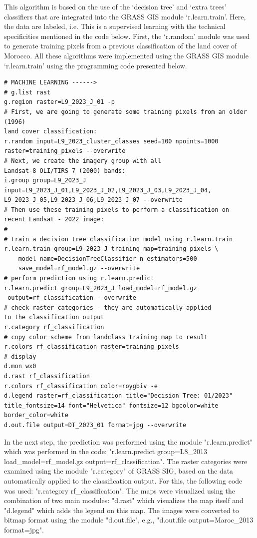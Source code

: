 \documentclass[geomatics,article,submit,pdftex,moreauthors]{Definitions/mdpi}
\begin{document}
This algorithm is based on the use of the ‘decision tree’ and ‘extra trees’ classifiers that are integrated into the GRASS GIS module ‘r.learn.train’. Here, the data are labeled, i.e. This is a supervised learning with the technical specificities mentioned in the code below. First, the ‘r.random’ module was used to generate training pixels from a previous classification of the land cover of Morocco. All these algorithms were implemented using the GRASS GIS module ‘r.learn.train’ using the programming code presented below.

\begin{footnotesize}
\begin{verbatim}
# MACHINE LEARNING ------>
# g.list rast
g.region raster=L9_2023_J_01 -p
# First, we are going to generate some training pixels from an older (1996) 
land cover classification:
r.random input=L9_2023_cluster_classes seed=100 npoints=1000 
raster=training_pixels --overwrite
# Next, we create the imagery group with all 
Landsat-8 OLI/TIRS 7 (2000) bands:
i.group group=L9_2023_J 
input=L9_2023_J_01,L9_2023_J_02,L9_2023_J_03,L9_2023_J_04,
L9_2023_J_05,L9_2023_J_06,L9_2023_J_07 --overwrite
# Then use these training pixels to perform a classification on 
recent Landsat - 2022 image:
#
# train a decision tree classification model using r.learn.train
r.learn.train group=L9_2023_J training_map=training_pixels \
    model_name=DecisionTreeClassifier n_estimators=500 
    save_model=rf_model.gz --overwrite
# perform prediction using r.learn.predict
r.learn.predict group=L9_2023_J load_model=rf_model.gz
 output=rf_classification --overwrite
# check raster categories - they are automatically applied 
to the classification output
r.category rf_classification
# copy color scheme from landclass training map to result
r.colors rf_classification raster=training_pixels
# display
d.mon wx0
d.rast rf_classification
r.colors rf_classification color=roygbiv -e
d.legend raster=rf_classification title="Decision Tree: 01/2023" 
title_fontsize=14 font="Helvetica" fontsize=12 bgcolor=white 
border_color=white
d.out.file output=DT_2023_01 format=jpg --overwrite
\end{verbatim}
\end{footnotesize}

In the next step, the prediction was performed using the module "r.learn.predict" which was performed in the code: "r.learn.predict group=L8\_2013 load\_model=rf\_model.gz output=rf\_classification". The raster categories were examined using the module "r.category" of GRASS SIG, based on the data automatically applied to the classification output. For this, the following code was used: "r.category rf\_classification". The maps were visualized using the combination of two main modules: "d.rast" which visualizes the map itself and "d.legend" which adds the legend on this map. The images were converted to bitmap format using the module "d.out.file", e.g., "d.out.file output=Maroc\_2013 format=jpg".
\end{document}
